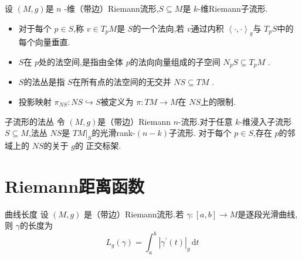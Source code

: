 \documentclass[../../几何与拓扑.tex]{subfiles}
\begin{document}
\begin{definition}
    设 $ \left( M,g \right)  $是 $ n $  -维（带边）Riemann流形,$ S\subseteq M $是 $ k  $-维Riemann子流形.
    \begin{itemize}
        \item 对于每个 $ p \in S $,称 $ v \in T_{p}M $是 $ S $的一个法向,若 $ v $通过内积 $ \left<\cdot ,\cdot  \right>_{g} $与 $ T_{p}S $中的每个向量垂直.
        \item $ S $在 $ p $处的法空间,是指由全体 $ p $的法向向量组成的子空间 $ N_{p}S\subseteq T_{p}M $          .
        \item $ S $的法丛是指 $ S $在所有点的法空间的无交并 $ NS\subseteq TM $ . 
        \item 投影映射 $ \pi_{NS}: NS\hookrightarrow S $被定义为 $ \pi:TM\to M $在 $ NS $上的限制.    
    \end{itemize}
    
\end{definition}

\begin{proposition}{子流形的法丛}
    令 $ \left( M,g \right)  $是（带边）Riemann $ n $-流形.对于任意 $ k $-维浸入子流形 $ S\subseteq M $,法丛 $ NS $是 $ TM|_{S} $的光滑rank-$ \left( n-k \right)  $子流形.      
    对于每个 $ p \in S $,存在 $ p $的邻域上的 $ NS $的关于 $ g $的 正交标架.  
\end{proposition}


\section{Riemann距离函数}
\begin{definition}{曲线长度}
    设 $ \left( M,g \right)  $ 是（带边）Riemann流形.若 $ \gamma:[a,b]\to M $是逐段光滑曲线,则
$ \gamma $的长度为 $$
L_{g}\left( \gamma \right) = \int_{a}^{b} \left| \gamma^{\prime} \left( t \right)  \right|_{g}  
\,\mathrm{d} t$$  
\end{definition}
\end{document}
